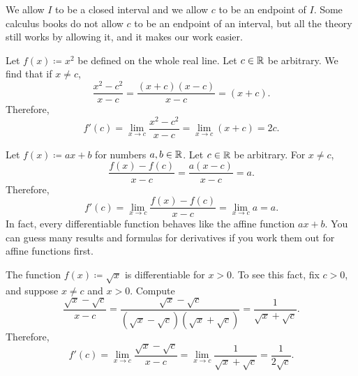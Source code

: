\begin{myfigureht}
\caption{Graphical interpretation of the derivative.\label{derivfig}}
\end{myfigureht}

We allow $I$ to be a closed interval and we allow
$c$ to be an endpoint of $I$.  Some calculus books do not allow $c$ to be an
endpoint of an interval, but all the theory still works by allowing it, and
it makes our work easier.

\begin{example}
Let $f(x) \coloneqq x^2$ be defined on the whole real line.  Let $c \in {\mathbb{R}}$ be arbitrary.  We find that if
$x \neq c$,
\begin{equation*}
\frac{x^2-c^2}{x-c} =
\frac{(x+c)(x-c)}{x-c} =
(x+c) .
\end{equation*}
Therefore,
\begin{equation*}
f'(c) = 
\lim_{x\to c} \frac{x^2-c^2}{x-c} =
\lim_{x\to c} (x+c) = 2c.
\end{equation*}
\end{example}

\begin{example}
Let $f(x) \coloneqq ax + b$ for numbers $a, b \in {\mathbb{R}}$.
Let $c \in {\mathbb{R}}$ be arbitrary.
For $x \neq c$,
\begin{equation*}
\frac{f(x)-f(c)}{x-c} =
\frac{a(x-c)}{x-c} = a .
\end{equation*}
Therefore,
\begin{equation*}
f'(c) =
\lim_{x\to c} 
\frac{f(x)-f(c)}{x-c} =
\lim_{x\to c} 
a = a.
\end{equation*}
In fact, every differentiable function  behaves like
the affine function $ax + b$.  You can guess many results
and formulas for derivatives if you work them out for affine functions
first.
\end{example}

\begin{example}
The function $f(x) \coloneqq \sqrt{x}$ is differentiable for $x > 0$.  To see this
fact, fix $c > 0$,
and suppose $x \neq c$ and $x > 0$.  Compute
\begin{equation*}
\frac{\sqrt{x}-\sqrt{c}}{x-c}
=
\frac{\sqrt{x}-\sqrt{c}}{(\sqrt{x}-\sqrt{c})(\sqrt{x}+\sqrt{c})}
=
\frac{1}{\sqrt{x}+\sqrt{c}} .
\end{equation*}
Therefore,
\begin{equation*}
f'(c) =
\lim_{x\to c}
\frac{\sqrt{x}-\sqrt{c}}{x-c}
=
\lim_{x\to c}
\frac{1}{\sqrt{x}+\sqrt{c}}
=
\frac{1}{2\sqrt{c}} .
\end{equation*}
\end{example}

